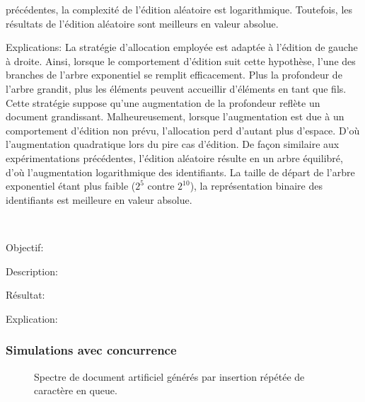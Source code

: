 \begin{asparadesc}
  précédentes, la complexité de l'édition aléatoire est
  logarithmique. Toutefois, les résultats de l'édition aléatoire sont meilleurs
  en valeur absolue.
\item [Explications:] La stratégie d'allocation employée est adaptée à l'édition
  de gauche à droite. Ainsi, lorsque le comportement d'édition suit cette
  hypothèse, l'une des branches de l'arbre exponentiel se remplit efficacement.
  Plus la profondeur de l'arbre grandit, plus les éléments peuvent accueillir
  d'éléments en tant que fils. Cette stratégie suppose qu'une augmentation de la
  profondeur reflète un document grandissant. Malheureusement, lorsque
  l'augmentation est due à un comportement d'édition non prévu, l'allocation
  perd d'autant plus d'espace. D'où l'augmentation quadratique lors du pire cas
  d'édition. De façon similaire aux expérimentations précédentes, l'édition
  aléatoire résulte en un arbre équilibré, d'où l'augmentation logarithmique des
  identifiants. La taille de départ de l'arbre exponentiel étant plus faible
  ($2^{5}$ contre $2^{10}$), la représentation binaire des identifiants est
  meilleure en valeur absolue.
\end{asparadesc}

\ \\

\begin{asparadesc}
\item [Objectif:]
\item [Description:]
\item [Résultat:]
\item [Explication:]
\end{asparadesc}

\subsubsection{Simulations avec concurrence}

\begin{figure*}
  \centering
  \hspace{10pt}
  \caption{Spectre de document artificiel générés par insertion répétée de caractère
  en queue.}
\end{figure*}


